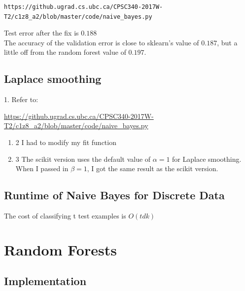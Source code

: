 \documentclass{article}
\def\enum#1{\begin{enumerate}#1\end{enumerate}}
\begin{document}
\begin{verbatim}
https://github.ugrad.cs.ubc.ca/CPSC340-2017W-T2/c1z8_a2/blob/master/code/naive_bayes.py
\end{verbatim}
Test error after the fix is $0.188$ 
\\ The accuracy of the validation error is close to sklearn's value of $0.187$, but a little off from the random forest value of $0.197$. 

\subsection{Laplace smoothing}

1. Refer to: 

\url{https://github.ugrad.cs.ubc.ca/CPSC340-2017W-T2/c1z8_a2/blob/master/code/naive_bayes.py}


\enum{
\item[2] I had to modify my fit function 
\item[3] The scikit version uses the default value of $\alpha = 1$ for Laplace smoothing. When I passed in $\beta = 1$, I got the same result as the scikit version. 
}

\subsection{Runtime of Naive Bayes for Discrete Data}

The cost of classifying t test examples is $O(tdk)$

\section{Random Forests}

\subsection{Implementation}
\end{document}
